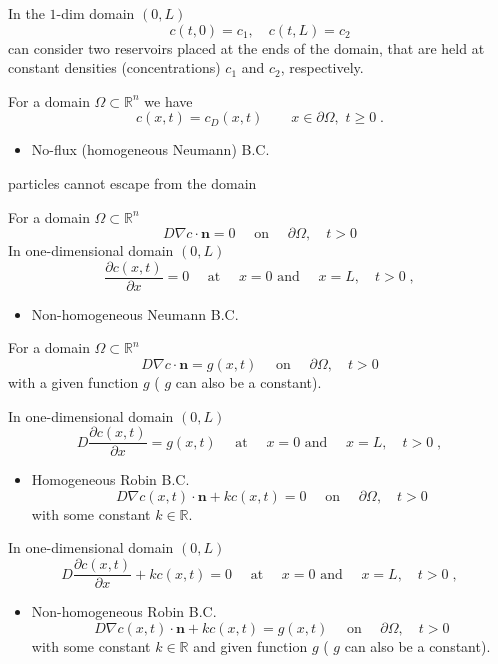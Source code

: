 \documentclass[
  letterpaper,
  DIV=11,
  numbers=noendperiod]{scrreprt}
\providecommand{\tightlist}{%
  \setlength{\itemsep}{0pt}\setlength{\parskip}{0pt}}\usepackage{longtable,booktabs,array}
\theoremstyle{plain}
\theoremstyle{definition}
\theoremstyle{plain}
\theoremstyle{remark}
\begin{document}
In the \(1\)-dim domain \((0,L)\) \[
c(t,0) = c_1, \quad  c(t,L) = c_2
\] can consider two reservoirs placed at the ends of the domain, that
are held at constant densities (concentrations) \(c_1\) and \(c_2\),
respectively.

For a domain \(\Omega\subset \mathbb R^n\) we have \[
c(x,t) = c_D(x,t) \qquad  x\in  \partial \Omega, \, \, t\geq 0 \; .
\]

\begin{itemize}
\tightlist
\item
  No-flux (homogeneous Neumann) B.C.
\end{itemize}

particles cannot escape from the domain

For a domain \(\Omega \subset \mathbb R^n\) \[
D\nabla c  \cdot {\mathbf{n}}  = 0  \quad \text{ on } \quad \partial \Omega, \quad t >0 
\] In one-dimensional domain \((0,L)\) \[
\frac{\partial c(x,t)}{\partial x} = 0 \quad \text{ at } \quad x=0  \text{ and } \quad x= L, \quad t >0 \; , 
\]

\begin{itemize}
\tightlist
\item
  Non-homogeneous Neumann B.C.
\end{itemize}

For a domain \(\Omega \subset \mathbb R^n\) \[
D\nabla c \cdot {\mathbf{n}} = g(x,t)  \quad \text{ on } \quad \partial \Omega, \quad t >0 
\] with a given function \(g\) ( \(g\) can also be a constant).

In one-dimensional domain \((0,L)\) \[
D \frac{\partial c(x,t)}{\partial x} = g(x,t)  \quad \text{ at } \quad x=0  \text{ and } \quad x= L, \quad t >0 \; , 
\]

\begin{itemize}
\tightlist
\item
  Homogeneous Robin B.C. \[
  D\nabla c(x,t)  \cdot {\mathbf{n}}  + k c(x,t)  = 0  \quad \text{ on } \quad \partial \Omega, \quad t >0 
  \] with some constant \(k \in \mathbb R\).
\end{itemize}

In one-dimensional domain \((0,L)\) \[
D \frac{\partial c(x,t)}{\partial x}  + k c(x,t) = 0  \quad \text{ at } \quad x=0  \text{ and } \quad x= L, \quad t >0 \; , 
\]

\begin{itemize}
\tightlist
\item
  Non-homogeneous Robin B.C. \[
  D\nabla c(x,t)  \cdot {\mathbf{n}}  + k c(x,t)  = g(x,t)  \quad \text{ on } \quad \partial \Omega, \quad t >0 
  \] with some constant \(k \in \mathbb R\) and given function \(g\) (
  \(g\) can also be a constant).
\end{itemize}
\end{document}
